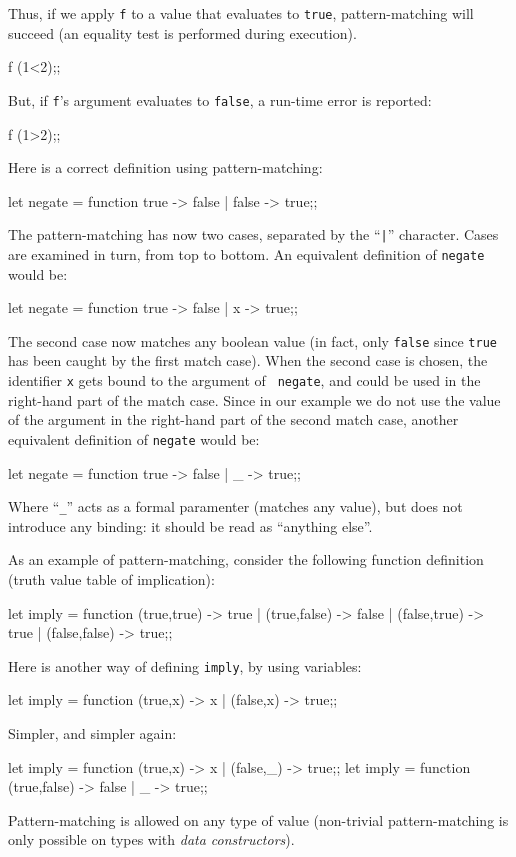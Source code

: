 Thus, if we apply {\tt f} to a value that evaluates to {\tt true},
pattern-matching will succeed (an equality test is performed during
execution).
\begin{caml_example}
f (1<2);;
\end{caml_example}
But, if {\tt f}'s argument evaluates to {\tt false}, a run-time
error is reported:
\begin{caml_example}
f (1>2);;
\end{caml_example}
Here is a correct definition using pattern-matching:
\begin{caml_example}
let negate = function true -> false
                    | false -> true;;
\end{caml_example}
The pattern-matching has now two cases, separated by the ``{\verb"|"}''
character.
Cases are examined in turn, from top to bottom. An equivalent definition of
{\tt negate} would be:
\begin{caml_example}
let negate = function true -> false
                    | x -> true;;
\end{caml_example}
The second case now matches any boolean value (in fact, only {\tt false} since
{\tt true} has been caught by the first match case). When the second case is
chosen, the identifier {\tt x} gets bound to the argument of {\tt
negate}, and could be used in the right-hand part of the match case.
Since in our example we do not use the value of the argument in the
right-hand part of the second match case, another equivalent
definition of {\tt negate} would be:
\begin{caml_example}
let negate = function true -> false
                    | _ -> true;;
\end{caml_example}
Where ``\verb"_"'' acts as a formal paramenter (matches any value), but does
not introduce any binding: it should be read as ``anything else''.

As an example of pattern-matching, consider the following function
definition (truth value table of implication):
\begin{caml_example}
let imply = function (true,true) -> true
                   | (true,false) -> false
                   | (false,true) -> true
                   | (false,false) -> true;;
\end{caml_example}
Here is another way of defining {\tt imply}, by using variables:
\begin{caml_example}
let imply = function (true,x) -> x
                   | (false,x) -> true;;
\end{caml_example}
Simpler, and simpler again:
\begin{caml_example}
let imply = function (true,x) -> x
                   | (false,_) -> true;;
let imply = function (true,false) -> false
                   | _ -> true;;
\end{caml_example}
Pattern-matching is allowed on any type of value (non-trivial
pattern-matching is only possible on types with {\em data constructors}).

